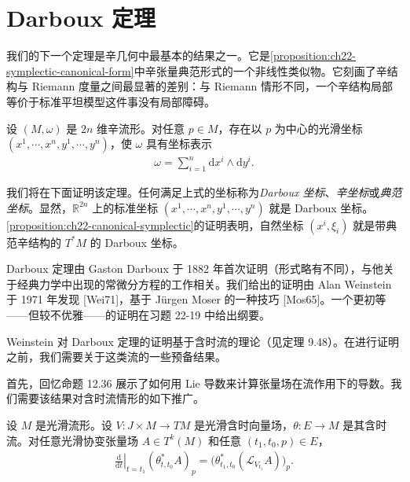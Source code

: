\documentclass[../../main.tex]{subfiles}
\begin{document}
\section{Darboux 定理}\label{section:ch22-darboux}

我们的下一个定理是辛几何中最基本的结果之一。它是\cref{proposition:ch22-symplectic-canonical-form}中辛张量典范形式的一个非线性类似物。它刻画了辛结构与 Riemann 度量之间最显著的差别：与 Riemann 情形不同，一个辛结构局部等价于标准平坦模型这件事没有局部障碍。

\begin{theorem}[Darboux]\label{theorem:ch22-darboux}
设 $(M,\omega)$ 是 $2n$ 维辛流形。对任意 $p\in M$，存在以 $p$ 为中心的光滑坐标 $(x^1,\cdots ,x^n,y^1,\cdots ,y^n)$，使 $\omega$ 具有坐标表示
\begin{align}
\omega=\sum_{i=1}^n \mathrm{d}x^i\wedge\mathrm{d}y^i.
\end{align}
\end{theorem}

我们将在下面证明该定理。任何满足上式的坐标称为\emph{Darboux 坐标}、\emph{辛坐标}或\emph{典范坐标}。显然，$\mathbb{R}^{2n}$ 上的标准坐标 $(x^1,\cdots ,x^n,y^1,\cdots ,y^n)$ 就是 Darboux 坐标。\cref{proposition:ch22-canonical-symplectic}的证明表明，自然坐标 $(x^i,\xi_i)$ 就是带典范辛结构的 $T^*M$ 的 Darboux 坐标。

Darboux 定理由 Gaston Darboux 于 1882 年首次证明（形式略有不同），与他关于经典力学中出现的常微分方程的工作相关。我们给出的证明由 Alan Weinstein 于 1971 年发现 [Wei71]，基于 J\"urgen Moser 的一种技巧 [Mos65]。一个更初等——但较不优雅——的证明在习题 22-19 中给出纲要。

Weinstein 对 Darboux 定理的证明基于含时流的理论（见定理 9.48）。在进行证明之前，我们需要关于这类流的一些预备结果。

首先，回忆命题 12.36 展示了如何用 Lie 导数来计算张量场在流作用下的导数。我们需要该结果对含时流情形的如下推广。

\begin{proposition}\label{proposition:ch22-flowout-pullback-deriv}
设 $M$ 是光滑流形。设 $V:J\times M\to TM$ 是光滑含时向量场，$\theta:E\to M$ 是其含时流。对任意光滑协变张量场 $A\in T^k(M)$ 和任意 $(t_1,t_0,p)\in E$，
\begin{align}
\left.\frac{\mathrm{d}}{\mathrm{d}t}\right|_{t=t_1}(\theta_{t,t_0}^*A)_p
=\big(\theta_{t_1,t_0}^*(\mathcal L_{V_{t_1}}A)\big)_p.
\end{align}
\end{proposition}
\end{document}
